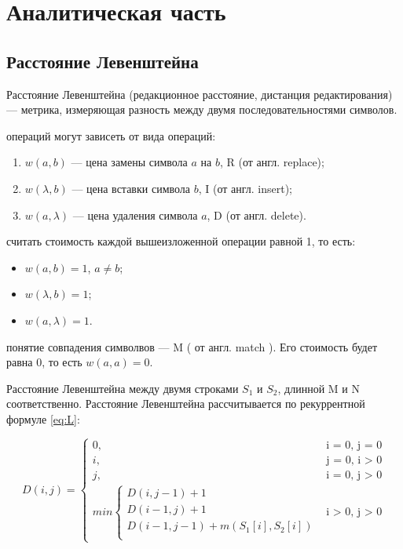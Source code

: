 \documentclass[a4paper,14pt, unknownkeysallowed]{bmstu}
\begin{document}
\chapter{Аналитическая часть}
	\section{Расстояние Левенштейна}

	Расстояние Левенштейна (редакционное расстояние, дистанция редактирования) --- метрика, измеряющая разность между двумя последовательностями символов.

	 операций могут зависеть от вида операций:
	\begin{enumerate}
       \item $w(a, b)$ --- цена замены символа $a$ на $b$, R (от англ. replace);
	    \item $w(\lambda, b)$ --- цена вставки символа $b$, I (от англ. insert);
	    \item $w(a, \lambda)$ --- цена удаления символа $a$, D (от англ. delete).
    \end{enumerate}

	 считать стоимость каждой вышеизложенной операции равной 1, то есть:
	\begin{itemize}
    	\item $w(a, b) = 1$, $a \neq b$;
    	\item $w(\lambda, b) = 1$;
    	\item $w(a, \lambda) = 1$.
    \end{itemize}

	 понятие совпадения символвов --- M ( от англ. match ). Его стоимость будет равна 0, то есть $w(a, a) = 0$.

	Расстояние Левенштейна между двумя строками $S_{1}$ и $S_{2}$, длинной M и N соответственно. Расстояние Левенштейна рассчитывается по рекуррентной формуле \ref{eq:L}:

	\begin{equation}
    	\label{eq:L}
    	D(i, j) =
    	\begin{cases}
    	0, &\text{i = 0, j = 0}\\
    	i, &\text{j = 0, i > 0}\\
    	j, &\text{i = 0, j > 0}\\
    	min \begin{cases}
    		D(i, j - 1) + 1\\
    		D(i - 1, j) + 1\\
    		D(i - 1, j - 1) +  m(S_{1}[i], S_{2}[i]) \\
    	    \end{cases}
    	&\text{i > 0, j > 0}
    	\end{cases}
    \end{equation}
\end{document}
